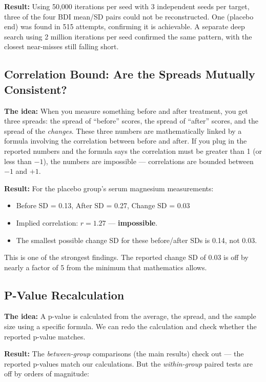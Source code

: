 \documentclass[11pt]{article}
\begin{document}
\textbf{Result:} Using 50,000 iterations per seed with 3 independent seeds per target, three of the four BDI mean/SD pairs could not be reconstructed. One (placebo end) was found in 515 attempts, confirming it is achievable. A separate deep search using 2 million iterations per seed confirmed the same pattern, with the closest near-misses still falling short.

\subsection{Correlation Bound: Are the Spreads Mutually Consistent?}

\textbf{The idea:} When you measure something before and after treatment, you get three spreads: the spread of ``before'' scores, the spread of ``after'' scores, and the spread of the \textit{changes}. These three numbers are mathematically linked by a formula involving the correlation between before and after. If you plug in the reported numbers and the formula says the correlation must be greater than 1 (or less than $-1$), the numbers are impossible --- correlations are bounded between $-1$ and $+1$.

\textbf{Result:} For the placebo group's serum magnesium measurements:
\begin{itemize}[nosep]
\item Before SD = 0.13, After SD = 0.27, Change SD = 0.03
\item Implied correlation: $r = 1.27$ --- \textcolor{fail}{\textbf{impossible}}.
\item The smallest possible change SD for these before/after SDs is 0.14, not 0.03.
\end{itemize}

This is one of the strongest findings. The reported change SD of 0.03 is off by nearly a factor of 5 from the minimum that mathematics allows.

\subsection{P-Value Recalculation}

\textbf{The idea:} A p-value is calculated from the average, the spread, and the sample size using a specific formula. We can redo the calculation and check whether the reported p-value matches.

\textbf{Result:} The \textit{between-group} comparisons (the main results) check out --- the reported p-values match our calculations. But the \textit{within-group} paired tests are off by orders of magnitude:
\end{document}
